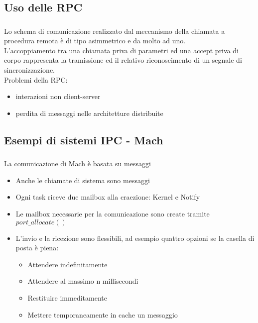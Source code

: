 \documentclass{beamer}
\newenvironment{mainframe}{
	\begin{frame}
		\frametitle{\insertsubsection}
		\framesubtitle{\insertsection}
	}{
	\end{frame}
}
\begin{document}
\subsection{Uso delle RPC}
\begin{mainframe}
	Lo schema di comunicazione realizzato dal meccanismo della chiamata a procedura remota è di tipo asimmetrico e da molto ad uno.\\
	L'accoppiamento tra una chiamata priva di parametri ed una accept priva di corpo rappresenta la tramissione ed il relativo riconoscimento di un segnale di sincronizzazione.\\
	Problemi della RPC:
	\begin{itemize}
		\item interazioni non client-server
		\item perdita di messaggi nelle architetture distribuite
	\end{itemize}
\end{mainframe}
\subsection{Esempi di sistemi IPC - Mach}
\begin{mainframe}
	La comunicazione di Mach è basata su messaggi
	\begin{itemize}
		\item Anche le chiamate di sistema sono messaggi
		\item Ogni task riceve due mailbox alla craezione: Kernel e Notify
		\item Le mailbox necessarie per la comunicazione sono create tramite \textit{$port\_allocate()$}
		\item L'invio e la ricezione sono flessibili, ad esempio quattro opzioni se la casella di posta è piena:
		\begin{itemize}
			\item Attendere indefinitamente
			\item Attendere al massimo n millisecondi
			\item Restituire immeditamente
			\item Mettere temporaneamente in cache un messaggio
		\end{itemize}
	\end{itemize}
\end{mainframe}
\end{document}
